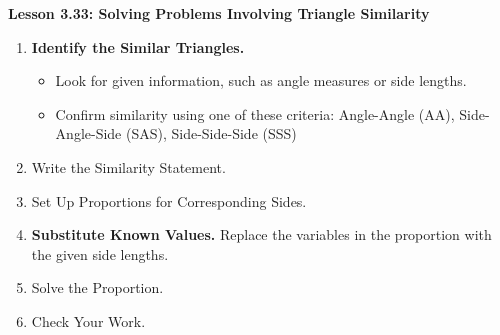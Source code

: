 \begin{center}
\textbf{Lesson 3.33: Solving Problems Involving Triangle Similarity}
\end{center}

\vspace*{-1.5ex}

\begin{enumerate}
    \item \textbf{Identify the Similar Triangles.}
    \begin{itemize}
        \item Look for given information, such as angle measures or side lengths.
        \item Confirm similarity using one of these criteria: Angle-Angle (AA),
Side-Angle-Side (SAS), Side-Side-Side (SSS)
    \end{itemize}

    \item Write the Similarity Statement.
  
    \item Set Up Proportions for Corresponding Sides.
  
    \item \textbf{Substitute Known Values.}
    Replace the variables in the proportion with the given side lengths.
    
    \item Solve the Proportion.
    
    \item Check Your Work.
    
\end{enumerate}

